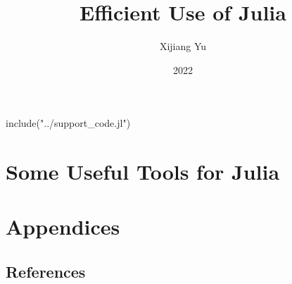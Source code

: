 \documentclass[fullbook]{tufte_algorithms_book}
\title{Efficient Use of Julia}
\author[LastnameOne and LastnameTwo]{Xijiang Yu}
\date{2022}
\begin{document}
\frontmatter



\tableofcontents


\mainmatter
\begin{jlcode}
	include("../support_code.jl")
\end{jlcode}

\part{Some Useful Tools for Julia} %


\appendix
\part*{Appendices}
{}%


\solutions
\backmatter
\chapter*{References}
\printbibliography[heading=none]

\printindex
\end{document}
